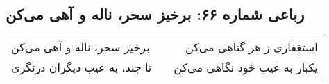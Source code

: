 \begin{center}
\section*{رباعی شماره ۶۶: برخیز سحر، ناله و آهی می‌کن}
\label{sec:066}
\begin{longtable}{l p{0.5cm} r}
برخیز سحر، ناله و آهی می‌کن
&&
استغفاری ز هر گناهی می‌کن
\\
تا چند، به عیب دیگران درنگری
&&
یکبار به عیب خود نگاهی می‌کن
\\
\end{longtable}
\end{center}
